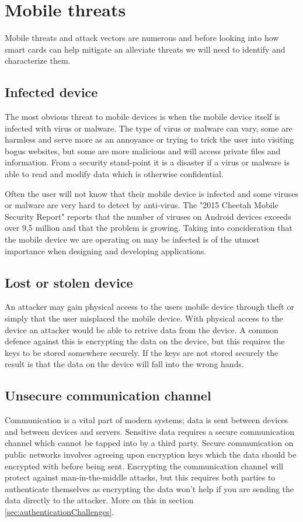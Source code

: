 \section{Mobile threats}
Mobile threats and attack vectors are numerous and before looking into how smart cards can help mitigate an alleviate threats we will need to identify and characterize them.
\subsection{Infected device}
The most obvious threat to mobile devices is when the mobile device itself is infected with virus or malware. The type of virus or malware can vary, some are harmless and serve more as an annoyance or trying to trick the user into visiting bogus websites, but some are more malicious and will access private files and information. From a security stand-point it is a disaster if a virus or malware is able to read and modify data which is otherwise confidential.

Often the user will not know that their mobile device is infected and some viruses or malware are very hard to detect by anti-virus. The "2015 Cheetah Mobile Security Report" \cite{cheetahSec} reports that the number of viruses on Android devices exceeds over 9,5 million and that the problem is growing. Taking into concideration that the mobile device we are operating on may be infected is of the utmost importance when designing and developing applications.

\subsection{Lost or stolen device}
An attacker may gain physical access to the users mobile device through theft or simply that the user misplaced the mobile device. With physical access to the device an attacker would be able to retrive data from the device. A common defence against this is encrypting the data on the device, but this requires the keys to be stored somewhere securely. If the keys are not stored securely the result is that the data on the device will fall into the wrong hands.

\subsection{Unsecure communication channel}
\label{sec:unsecureCommunication}
Communication is a vital part of modern systems; data is sent between devices and between devices and servers. Sensitive data requires a secure communication channel which cannot be tapped into by a third party. Secure communication on public networks involves agreeing upon encryption keys which the data should be encrypted with before being sent. Encrypting the communication channel will protect against man-in-the-middle attacks, but this requires both parties to authenticate themselves as encrypting the data won't help if you are sending the data directly to the attacker. More on this in section \ref{sec:authenticationChallenges}.

